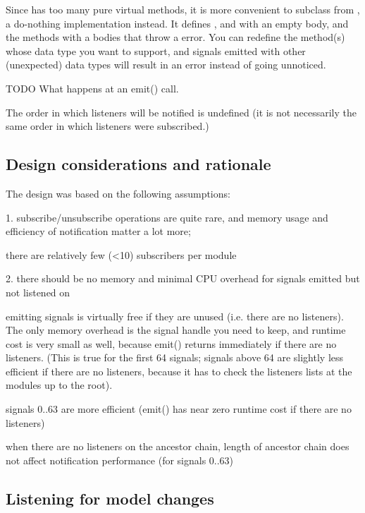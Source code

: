 \begin{note}
\begin{note}
\begin{itemize}
\end{itemize}

Since  has too many pure virtual methods, it is more
convenient to subclass from , a do-nothing implementation
instead. It defines ,  and
 with an empty body, and the 
methods with a bodies that throw a  error.
You can redefine the  method(s) whose data type
you want to support, and signals emitted with other (unexpected) data
types will result in an error instead of going unnoticed.

TODO What happens at an emit() call.

The order in which listeners will be notified is undefined (it is not necessarily
the same order in which listeners were subscribed.)


\subsection{Design considerations and rationale}

The design was based on the following assumptions:

1. subscribe/unsubscribe operations are quite rare,
and memory usage and efficiency of notification matter a lot more;

there are relatively few (<10) subscribers per module

2. there should be no memory and minimal CPU overhead for signals emitted but not listened on

emitting signals is virtually free if they are unused (i.e. there are
no listeners). The only memory overhead is the signal handle you need
to keep, and runtime cost is very small as well, because emit()
returns immediately if there are no listeners. (This is true for the
first 64 signals; signals above 64 are slightly less efficient if there
are no listeners, because it has to check the listeners lists at
the modules up to the root).

signals 0..63 are more efficient (emit() has near zero runtime cost if there
are no listeners)

when there are no listeners on the ancestor chain, length of ancestor chain
does not affect notification performance (for signals 0..63)



\subsection{Listening for model changes}


\end{note}
\end{note}
